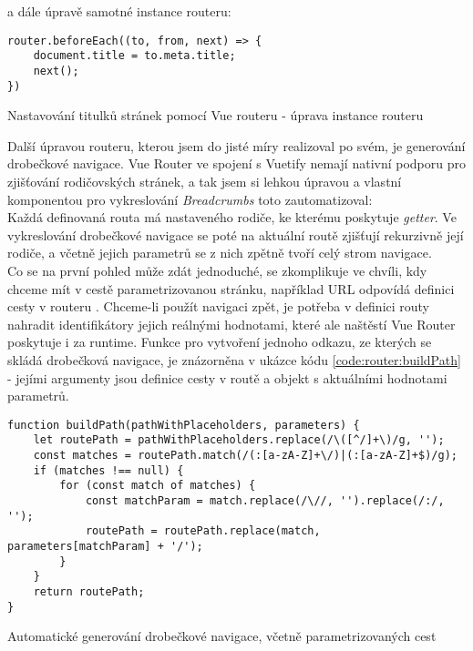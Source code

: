 a dále úpravě samotné instance routeru:

\begin{listing}[H]
    \begin{verbatim}
router.beforeEach((to, from, next) => {
    document.title = to.meta.title;
    next();
})
\end{verbatim}
\caption{Nastavování titulků stránek pomocí Vue routeru - úprava instance routeru} \label{code:vue-router-title2}
\end{listing}

Další úpravou routeru, kterou jsem do jisté míry realizoval po svém, je generování drobečkové navigace. Vue Router ve spojení s Vuetify nemají nativní podporu pro zjišťování rodičovských stránek, a tak jsem si lehkou úpravou a vlastní komponentou pro vykreslování \emph{Breadcrumbs} toto zautomatizoval:\\
Každá definovaná routa má nastaveného rodiče, ke kterému poskytuje \emph{getter}. Ve vykreslování drobečkové navigace se poté na aktuální routě zjišťují rekurzivně její rodiče, a včetně jejich parametrů se z nich zpětně tvoří celý strom navigace.\\
Co se na první pohled může zdát jednoduché, se zkomplikuje ve chvíli, kdy chceme mít v cestě parametrizovanou stránku, například URL  odpovídá definici cesty v routeru . Chceme-li použít navigaci zpět, je potřeba v definici routy nahradit identifikátory jejich reálnými hodnotami, které ale naštěstí Vue Router poskytuje i za runtime. Funkce pro vytvoření jednoho odkazu, ze kterých se skládá drobečková navigace, je znázorněna v ukázce kódu \ref{code:router:buildPath} - jejími argumenty jsou definice cesty v routě a objekt s aktuálními hodnotami parametrů.

\begin{listing}[H]
    \begin{verbatim}
function buildPath(pathWithPlaceholders, parameters) {
    let routePath = pathWithPlaceholders.replace(/\([^/]+\)/g, '');
    const matches = routePath.match(/(:[a-zA-Z]+\/)|(:[a-zA-Z]+$)/g);
    if (matches !== null) {
        for (const match of matches) {
            const matchParam = match.replace(/\//, '').replace(/:/, '');
            routePath = routePath.replace(match, parameters[matchParam] + '/');
        }
    }
    return routePath;
}
\end{verbatim}
\caption{Automatické generování drobečkové navigace, včetně parametrizovaných cest} \label{code:router:buildPath}
\end{listing}

